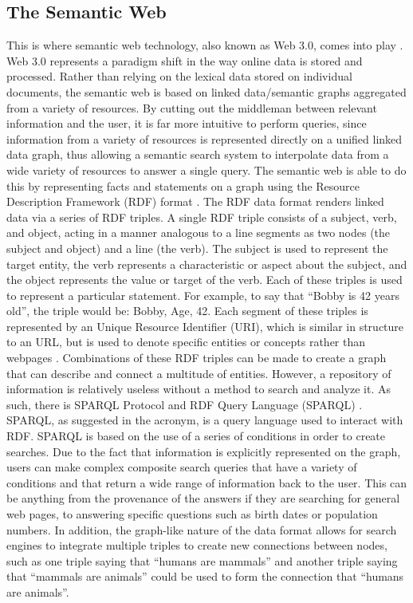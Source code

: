 \documentclass[12pt]{article}
\begin{document}
	\subsection{The Semantic Web}
	\quad This is where semantic web technology, also known as Web 3.0, comes into play \cite{berners2001semantic}. Web 3.0 represents a paradigm shift in the way online data is stored and processed. Rather than relying on the lexical data stored on individual documents, the semantic web is based on linked data/semantic graphs aggregated from a variety of resources. By cutting out the middleman between relevant information and the user, it is far more intuitive to perform queries, since information from a variety of resources is represented directly on a unified linked data graph, thus allowing a semantic search system to interpolate data from a wide variety of resources to answer a single query. The semantic web is able to do this by representing facts and statements on a graph using the Resource Description Framework (RDF) format \cite{lassila1999resource}. The RDF data format renders linked data via a series of RDF triples. A single RDF triple consists of a subject, verb, and object, acting in a manner analogous to a line segments as two nodes (the subject and object) and a line (the verb). The subject is used to represent the target entity, the verb represents a characteristic or aspect about the subject, and the object represents the value or target of the verb. Each of these triples is used to represent a particular statement. For example, to say that “Bobby is 42 years old”, the triple would be: Bobby, Age, 42. Each segment of these triples is represented by an Unique Resource Identifier (URI), which is similar in structure to an URL, but is used to denote specific entities or concepts rather than webpages \cite{berners2004uniform}. Combinations of these RDF triples can be made to create a graph that can describe and connect a multitude of entities. However, a repository of information is relatively useless without a method to search and analyze it. As such, there is SPARQL Protocol and RDF Query Language (SPARQL) \cite{harris2013sparql}. SPARQL, as suggested in the acronym, is a query language used to interact with RDF. SPARQL is based on the use of a series of conditions in order to create searches.  Due to the fact that information is explicitly represented on the graph, users can make complex composite search queries that have a variety of conditions and that return a wide range of information back to the user. This can be anything from the provenance of the answers if they are searching for general web pages, to answering specific questions such as birth dates or population numbers. In addition, the graph-like nature of the data format allows for search engines to integrate multiple triples to create new connections between nodes, such as one triple saying that “humans are mammals” and another triple saying that “mammals are animals” could be used to form the connection that “humans are animals”.
\end{document}
